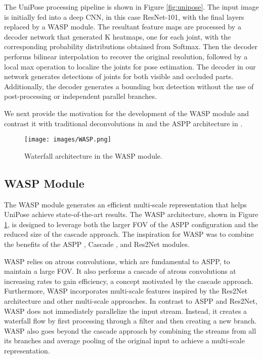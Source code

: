 \documentclass[10pt,twocolumn,letterpaper]{article}
\begin{document}
The UniPose processing pipeline is shown in Figure \ref{fig:unipose}. The input image is initially fed into a deep CNN, in this case  ResNet-101, with the final layers replaced by a WASP module. 
The resultant feature maps are processed by a decoder network that generated K heatmaps, one for each joint, with the corresponding probability distributions obtained from Softmax. 
Then the decoder performs bilinear interpolation to recover the original resolution, followed by a local max operation to localize the joints for pose estimation.
The decoder in our network generates detections of joints for both visible and occluded parts. 
Additionally, the decoder generates a bounding box detection without the use of post-processing or independent parallel branches. 



We next provide the motivation for the development of the WASP module and contrast it with traditional deconvolutions in \cite{FCN} and the ASPP architecture in \cite{DeepLab}.

\begin{figure}[ht]
\begin{center}
\texttt{[image: images/WASP.png]}
\end{center}
  \caption{Waterfall architecture in the WASP module.}
\label{fig:WASP}
\end{figure}

\subsection{WASP Module}
The WASP module generates an efficient multi-scale representation that 
helps UniPose achieve state-of-the-art results.
The WASP architecture, shown in Figure \ref{fig:WASP}, is designed to leverage both the larger FOV of the ASPP configuration and the reduced size of the cascade approach.
The inspiration for WASP was to combine the benefits of the ASPP  \cite{DeepLab}, Cascade  \cite{Rethinking}, and Res2Net  \cite{Res2Net} modules.

WASP relies on atrous convolutions, which are fundamental to ASPP, to maintain a large FOV. It also performs a cascade of atrous convolutions at increasing rates to gain efficiency, a concept motivated by the cascade approach. Furthermore, WASP incorporates multi-scale features inspired by the Res2Net architecture and other multi-scale approaches. In contrast to ASPP and Res2Net, WASP does not immediately parallelize the input stream. Instead, it creates a waterfall flow by first processing through a filter and then creating a new branch. WASP also goes beyond the cascade approach by combining the streams from all its branches and average pooling of the original input to achieve a multi-scale representation.
\end{document}
